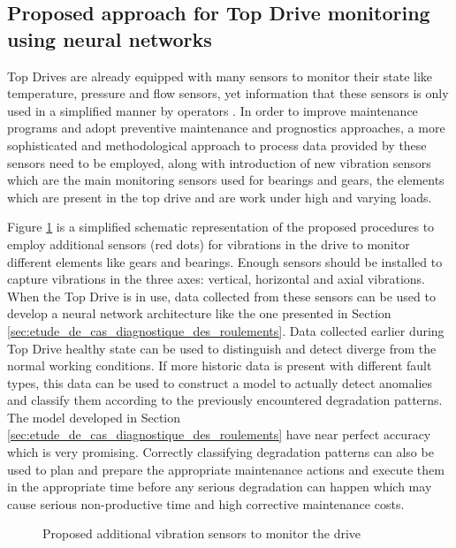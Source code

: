 \subsection{Proposed approach for Top Drive monitoring using neural networks}%
\label{sub:proposed_approach_for_top_drive_monitoring_using_neural_networks}

Top Drives are already equipped with many sensors to monitor their state like temperature, pressure and flow sensors, yet information that these sensors is only used in a simplified manner by operators \cite{Pournazari2016}. In order to improve maintenance programs and adopt preventive maintenance and prognostics approaches, a more sophisticated and methodological approach to process data provided by these sensors need to be employed, along with introduction of new vibration sensors which are the main monitoring sensors used for bearings and gears, the elements which are present in the top drive and are work under high and varying loads.

Figure \ref{fig:topdrive-drive-sensors} is a simplified schematic representation of the proposed procedures to employ additional sensors (red dots) for vibrations in the drive to monitor different elements like gears and bearings. Enough sensors should be installed to capture vibrations in the three axes: vertical, horizontal and axial vibrations. When the Top Drive is in use, data collected from these sensors can be used to develop a neural network architecture like the one presented in Section \ref{sec:etude_de_cas_diagnostique_des_roulements}. Data collected earlier during Top Drive healthy state can be used to distinguish and detect diverge from the normal working conditions. If more historic data is present with different fault types, this data can be used to construct a model to actually detect anomalies and classify them according to the previously encountered degradation patterns. The model developed in Section \ref{sec:etude_de_cas_diagnostique_des_roulements} have near perfect accuracy which is very promising. Correctly classifying degradation patterns can also be used to plan and prepare the appropriate maintenance actions and execute them in the appropriate time before any serious degradation can happen which may cause serious non-productive time and high corrective maintenance costs. 

\begin{figure}[h]
	\centering
	
	\caption{Proposed additional vibration sensors to monitor the drive}%
	\label{fig:topdrive-drive-sensors}
\end{figure}

